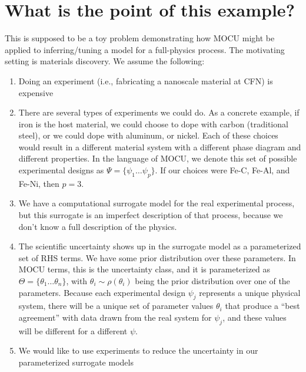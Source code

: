\documentclass[11pt]{article}
\begin{document}
\newcommand*{\vertbar}{\rule[-1ex]{0.5pt}{2.5ex}}
\newcommand*{\horzbar}{\rule[.5ex]{2.5ex}{0.5pt}}
\maketitle

\newpage
{}

\section{What is the point of this example?}

This is supposed to be a toy problem demonstrating how MOCU might be
applied to inferring/tuning a model for a full-physics process. The
motivating setting is materials discovery. We assume the following:

\begin{enumerate}
\item Doing an experiment (i.e., fabricating a nanoscale material at CFN) is expensive
\item There are several types of experiments we could do. As a concrete example, if iron is the host material, we could choose to dope with carbon (traditional steel), or we could dope with aluminum, or nickel. Each of these choices would result in a different material system with a different phase diagram and different properties. In the language of MOCU, we denote this set of possible experimental designs as $\Psi = \lbrace \psi_1 \dots \psi_p \rbrace$. If our choices were Fe-C, Fe-Al, and Fe-Ni, then $p=3$.
\item We have a computational surrogate model for the real experimental process, but this surrogate is an imperfect description of that process, because we don't know a full description of the physics.
\item The scientific uncertainty shows up in the surrogate model as a parameterized set of RHS terms. We have some prior distribution over these parameters. In MOCU terms, this is the uncertainty class, and it is parameterized as $\Theta = \lbrace \theta_1 \dots \theta_n \rbrace$, with $\theta_i \sim \rho(\theta_i)$ being the prior distribution over one of the parameters. Because each experimental design $\psi_j$ represents a unique physical system, there will be a unique set of parameter values $\theta_i$ that produce a ``best agreement'' with data drawn from the real system for $\psi_j$, and these values will be different for a different $\psi$.
\item We would like to use experiments to reduce the uncertainty in our parameterized surrogate models
\end{enumerate}
\end{document}
